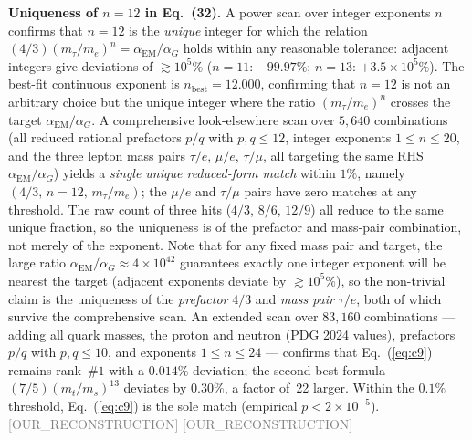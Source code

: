 \documentclass[twocolumn,prd,amsmath,amssymb,floatfix]{revtex4-2}
\newcommand{\reconstruction}{\textcolor{gray}{\small[OUR\_RECONSTRUCTION]}}
\begin{document}
\textbf{Uniqueness of $n=12$ in Eq.~(32).}
A power scan over integer exponents $n$ confirms that $n=12$ is the
\emph{unique} integer for which the relation
$(4/3)(m_\tau/m_e)^n = \alpha_\mathrm{EM}/\alpha_G$ holds within any
reasonable tolerance: adjacent integers give deviations of $\gtrsim 10^5\%$
($n=11$: $-99.97\%$; $n=13$: $+3.5\times10^5\%$). The best-fit
continuous exponent is $n_\mathrm{best} = 12.000$, confirming that $n=12$
is not an arbitrary choice but the unique integer where the ratio
$(m_\tau/m_e)^n$ crosses the target $\alpha_\mathrm{EM}/\alpha_G$.
A comprehensive look-elsewhere scan over $5{,}640$ combinations
(all reduced rational prefactors $p/q$ with $p,q\le 12$, integer exponents
$1\le n\le 20$, and the three lepton mass pairs $\tau/e$, $\mu/e$, $\tau/\mu$,
all targeting the same RHS $\alpha_\mathrm{EM}/\alpha_G$)
yields a \emph{single unique reduced-form match} within $1\%$, namely
$(4/3,\,n{=}12,\,m_\tau/m_e)$; the $\mu/e$ and $\tau/\mu$ pairs have zero
matches at any threshold.
The raw count of three hits ($4/3$, $8/6$, $12/9$) all reduce to the same
unique fraction, so the uniqueness is of the prefactor and mass-pair
combination, not merely of the exponent.
Note that for any fixed mass pair and target, the large ratio
$\alpha_\mathrm{EM}/\alpha_G \approx 4{\times}10^{42}$ guarantees exactly
one integer exponent will be nearest the target (adjacent exponents deviate
by $\gtrsim 10^5\%$), so the non-trivial claim is the uniqueness of the
\emph{prefactor} $4/3$ and \emph{mass pair} $\tau/e$, both of which
survive the comprehensive scan.
An extended scan over $83{,}160$ combinations --- adding all quark masses,
the proton and neutron (PDG 2024 values), prefactors $p/q$ with $p,q\le 10$,
and exponents $1\le n\le 24$ --- confirms that Eq.~(\ref{eq:c9}) remains
rank~$\#1$ with a $0.014\%$ deviation; the second-best formula
$(7/5)(m_t/m_s)^{13}$ deviates by $0.30\%$, a factor of~22 larger.
Within the $0.1\%$ threshold, Eq.~(\ref{eq:c9}) is the sole match
(empirical $p < 2\times10^{-5}$).
\reconstruction
\reconstruction
\end{document}
